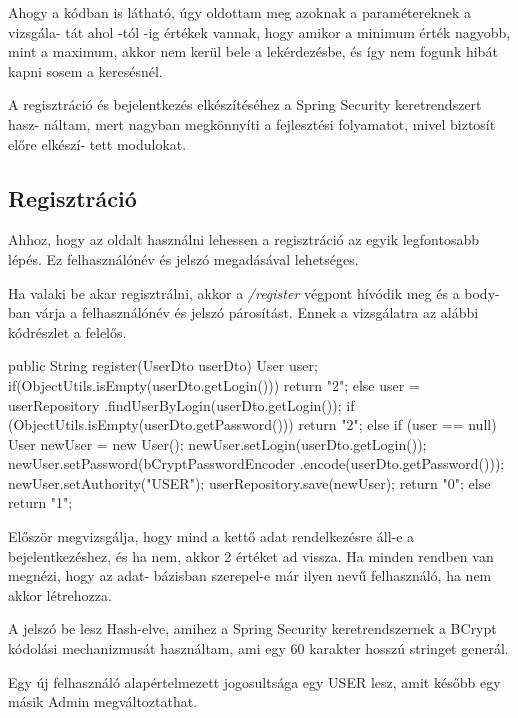 Ahogy a kódban is látható, úgy oldottam meg azoknak a paramétereknek a vizsgála-
tát ahol -tól -ig értékek vannak, hogy amikor a minimum érték nagyobb, mint a maximum, akkor nem kerül bele a lekérdezésbe, és így nem fogunk hibát kapni sosem a keresésnél.

A regisztráció és bejelentkezés elkészítéséhez a Spring Security keretrendszert \cite{SpringSecurity} hasz-
náltam, mert nagyban megkönnyíti a fejlesztési folyamatot, mivel biztosít előre elkészí-
tett modulokat.

\subsection{Regisztráció}
Ahhoz, hogy az oldalt használni lehessen  a regisztráció az egyik legfontosabb lépés. Ez felhasználónév és  jelszó megadásával lehetséges. 

Ha valaki be akar regisztrálni, akkor a  \textit{/register} végpont hívódik meg és a body-ban várja a felhasználónév és jelszó párosítást. Ennek a vizsgálatra az alábbi kódrészlet a felelős.

\begin{java}
public String register(UserDto userDto) {
User user;
   if(ObjectUtils.isEmpty(userDto.getLogin())) {
     return "2";
   } else {
       user = userRepository
         .findUserByLogin(userDto.getLogin());
   }
   if (ObjectUtils.isEmpty(userDto.getPassword())) {
     return "2";
   } else {
       if (user == null) {
          User newUser = new User();
          newUser.setLogin(userDto.getLogin());
          newUser.setPassword(bCryptPasswordEncoder
                     .encode(userDto.getPassword()));
          newUser.setAuthority("USER");
          userRepository.save(newUser); 
          return "0";
       } else {
          return "1";
       }
   }
}
\end{java}

Először megvizsgálja, hogy mind a kettő adat rendelkezésre áll-e a bejelentkezéshez, és ha nem, akkor 2 értéket ad vissza. Ha minden rendben van megnézi, hogy az adat-
bázisban szerepel-e már ilyen nevű felhasználó, ha nem akkor létrehozza.


A jelszó be lesz Hash-elve, amihez a Spring Security  keretrendszernek a BCrypt kódolási mechanizmusát használtam, ami egy 60 karakter hosszú stringet generál.

Egy új felhasználó alapértelmezett jogosultsága egy USER lesz, amit később egy másik Admin megváltoztathat.

